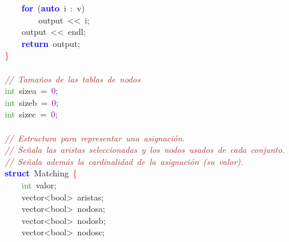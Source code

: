 \mbox{}\ \ \ \ \textbf{\textcolor{Blue}{for}}\ \textcolor{BrickRed}{(}\textbf{\textcolor{Blue}{auto}}\ i\ \textcolor{BrickRed}{:}\ v\textcolor{BrickRed}{)} \\
\mbox{}\ \ \ \ \ \ \ \ output\ \textcolor{BrickRed}{\textless{}\textless{}}\ i\textcolor{BrickRed}{;} \\
\mbox{}\ \ \ \ output\ \textcolor{BrickRed}{\textless{}\textless{}}\ endl\textcolor{BrickRed}{;} \\
\mbox{}\ \ \ \ \textbf{\textcolor{Blue}{return}}\ output\textcolor{BrickRed}{;} \\
\mbox{}\textcolor{Red}{\}} \\
\mbox{} \\
\mbox{}\textit{\textcolor{Brown}{//\ Tamaños\ de\ las\ tablas\ de\ nodos}} \\
\mbox{}\textcolor{ForestGreen}{int}\ sizea\ \textcolor{BrickRed}{=}\ \textcolor{Purple}{0}\textcolor{BrickRed}{;} \\
\mbox{}\textcolor{ForestGreen}{int}\ sizeb\ \textcolor{BrickRed}{=}\ \textcolor{Purple}{0}\textcolor{BrickRed}{;} \\
\mbox{}\textcolor{ForestGreen}{int}\ sizec\ \textcolor{BrickRed}{=}\ \textcolor{Purple}{0}\textcolor{BrickRed}{;} \\
\mbox{} \\
\mbox{}\textit{\textcolor{Brown}{//\ Estructura\ para\ representar\ una\ asignación.}} \\
\mbox{}\textit{\textcolor{Brown}{//\ Señala\ las\ aristas\ seleccionadas\ y\ los\ nodos\ usados\ de\ cada\ conjunto.}} \\
\mbox{}\textit{\textcolor{Brown}{//\ Señala\ además\ la\ cardinalidad\ de\ la\ asignación\ (su\ valor).}} \\
\mbox{}\textbf{\textcolor{Blue}{struct}}\ \textcolor{TealBlue}{Matching}\ \textcolor{Red}{\{} \\
\mbox{}\ \ \ \ \textcolor{ForestGreen}{int}\ valor\textcolor{BrickRed}{;} \\
\mbox{}\ \ \ \ \textcolor{TealBlue}{vector\textless{}bool\textgreater{}}\ aristas\textcolor{BrickRed}{;} \\
\mbox{}\ \ \ \ \textcolor{TealBlue}{vector\textless{}bool\textgreater{}}\ nodosa\textcolor{BrickRed}{;} \\
\mbox{}\ \ \ \ \textcolor{TealBlue}{vector\textless{}bool\textgreater{}}\ nodosb\textcolor{BrickRed}{;} \\
\mbox{}\ \ \ \ \textcolor{TealBlue}{vector\textless{}bool\textgreater{}}\ nodosc\textcolor{BrickRed}{;} \\
